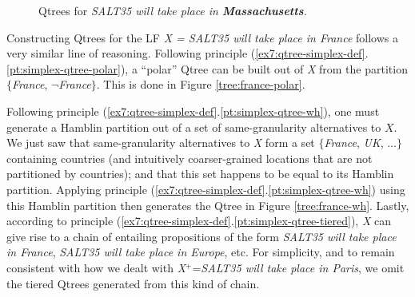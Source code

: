 \begin{figure}[H]
	\centering
	\begin{subfigure}[b]{.3\linewidth}
		\centering
		\caption{}\label{tree:paris-polar}
	\end{subfigure}
	\hfill
	\begin{subfigure}[b]{.3\linewidth}
		\centering
		\caption{}\label{tree:paris-wh}
	\end{subfigure}\hfill
	\begin{subfigure}[b]{.3\linewidth}
		\centering
		\caption{}\label{tree:paris-tiered}
	\end{subfigure}
	
	
	\caption{Qtrees for \textit{SALT35 will take place in \textbf{Massachusetts}.}}\label{fig7:city-partition}
\end{figure}

Constructing Qtrees for the LF \textit{X = SALT35 will take place in France} follows a very similar line of reasoning. Following principle (\ref{ex7:qtree-simplex-def}.\ref{pt:simplex-qtree-polar}), a ``polar'' Qtree can be built out of \textit{X} from the partition $\lbrace$\textit{France}, $\neg$\textit{France}$\rbrace$. This is done in Figure \ref{tree:france-polar}.



Following principle (\ref{ex7:qtree-simplex-def}.\ref{pt:simplex-qtree-wh}), one must generate a Hamblin partition out of a set of same-granularity alternatives to $X$. We just saw that same-granularity alternatives to \textit{X} form a set $\lbrace$\textit{France}, \textit{UK}, ...$\rbrace$ containing countries (and intuitively coarser-grained locations that are not partitioned by countries); and that this set happens to be equal to its Hamblin partition. Applying principle (\ref{ex7:qtree-simplex-def}.\ref{pt:simplex-qtree-wh}) using this Hamblin partition then generates the Qtree in Figure \ref{tree:france-wh}. Lastly, according to principle (\ref{ex7:qtree-simplex-def}.\ref{pt:simplex-qtree-tiered}), \textit{X} can give rise to a chain of entailing propositions of the form \textit{SALT35 will take place in France}, \textit{SALT35 will take place in Europe}, etc. For simplicity, and to remain consistent with how we dealt with \textit{X}$^+$=\textit{SALT35 will take place in Paris}, we omit the tiered Qtrees generated from this kind of chain.

